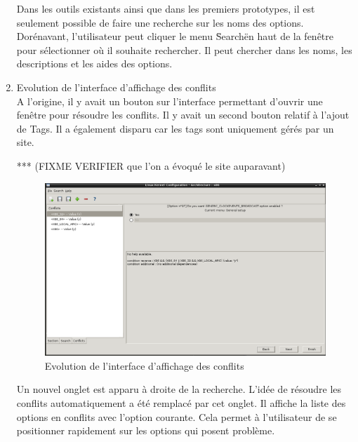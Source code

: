 \documentclass[16pts]{report}
\begin{document}
\begin{enumerate}
	Dans les outils existants ainsi que dans les premiers prototypes, il est 
	seulement possible de faire une recherche sur les noms des options. 
	Dorénavant, l'utilisateur peut cliquer le menu \"Search\" en haut de la 
	fenêtre pour sélectionner où il souhaite rechercher. Il peut chercher dans 
	les noms, les descriptions et les aides des options.
	\\

	\pagebreak	

	\item Evolution de l'interface d'affichage des conflits
	\\

	A l'origine, il y avait un bouton sur l'interface permettant d'ouvrir 
	une fenêtre pour résoudre les conflits. Il y avait un second bouton relatif 
	à l'ajout de Tags. Il a également disparu car les tags sont uniquement 
	gérés par un site. 

	*** (FIXME VERIFIER que l'on a évoqué le site auparavant)

	\begin{figure}[H]
		\includegraphics[scale=0.5]{../illustrations/screen_options_conflits_interface.png}
		\centering
		\caption{Evolution de l'interface d'affichage des conflits}
		\label{fig:Evo_config}
	\end{figure}

	Un nouvel onglet est apparu à droite de la recherche. L'idée de résoudre 
	les conflits automatiquement a été remplacé par cet onglet. Il affiche 
	la liste des options en conflits avec l'option courante. Cela permet à 
	l'utilisateur de se positionner rapidement sur les options qui posent 
	problème. 
	\\



\end{enumerate}
\end{document}
